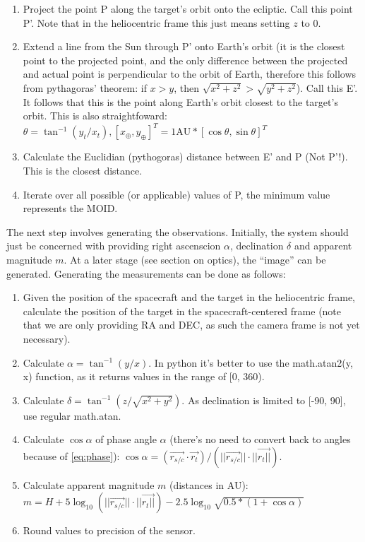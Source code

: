 \documentclass[a4paper,10pt]{article}
\begin{document}
\begin{enumerate}
 \item Project the point P along the target's orbit onto the ecliptic. Call this point P'. Note that in the heliocentric frame this just means setting $z$ to 0.
 \item Extend a line from the Sun through P' onto Earth's orbit (it is the closest point to the projected point, and the only difference between the projected and actual point is perpendicular to the orbit of Earth, therefore this follows from pythagoras' theorem: if $x > y$, then $\sqrt{x^2 + z^2} > \sqrt{y^2 + z^2}$). Call this E'. It follows that this is the point along Earth's orbit closest to the target's orbit. This is also straightfoward: $\theta = \tan^{-1}(y_t/x_t), [x_\oplus, y_\oplus]^T = 1\mathrm{AU} * [\cos \theta, \sin \theta ]^T$
 \item Calculate the Euclidian (pythogoras) distance between E' and P (Not P'!). This is the closest distance.
 \item Iterate over all possible (or applicable) values of P, the minimum value represents the MOID.
\end{enumerate}

The next step involves generating the observations. Initially, the system should just be concerned with providing right ascenscion $\alpha$, declination $\delta$ and apparent magnitude $m$. At a later stage (see section on optics), the ``image'' can be generated. Generating the measurements can be done as follows:

\begin{enumerate}
 \item Given the position of the spacecraft and the target in the heliocentric frame, calculate the position of the target in the spacecraft-centered frame (note that we are only providing RA and DEC, as such the camera frame is not yet necessary).
 \item Calculate $\alpha = \tan^{-1}(y/x)$. In python it's better to use the math.atan2(y, x) function, as it returns values in the range of [0, 360).
 \item Calculate $\delta = \tan^{-1}(z/\sqrt{x^2 + y^2})$. As declination is limited to [-90, 90], use regular math.atan.
 \item Calculate $\cos \alpha$ of phase angle $\alpha$ (there's no need to convert back to angles because of \autoref{eq:phase}): $\cos \alpha = (\vec{r_{s/c}} \cdot \vec{r_{t}}) / (||\vec{r_{s/c}}|| \cdot ||\vec{r_{t}||})$.
 \item Calculate apparent magnitude $m$ (distances in AU): $m = H + 5 \log _{10} (||\vec{r_{s/c}}|| \cdot ||\vec{r_{t}||}) - 2.5 \log _{10}\sqrt{0.5*(1+\cos \alpha)}$
 \item Round values to precision of the sensor.
\end{enumerate}
\end{document}
